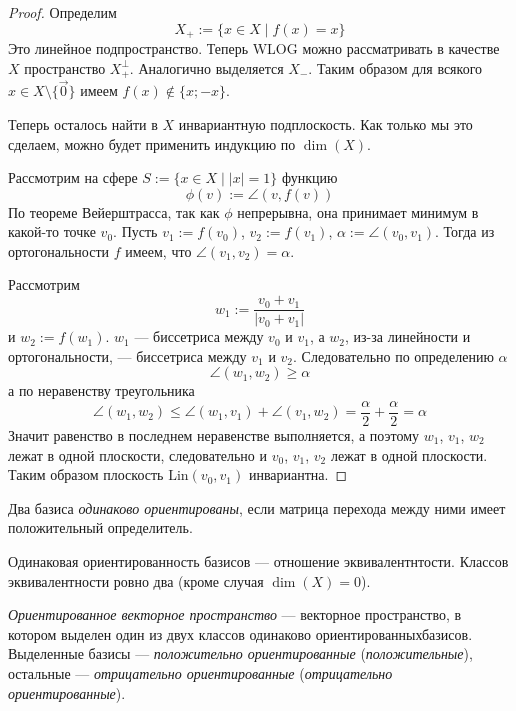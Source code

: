 \documentclass[12pt,a4paper]{article}
\newcommand{\Lin}{\ensuremath{\mathrm{Lin}}\xspace}
\begin{document}
    \begin{proof}
        Определим
        \[X_+ := \{x \in X \mid f(x) = x\}\]
        Это линейное подпространство. Теперь WLOG можно рассматривать в качестве $X$ пространство $X_+^\perp$. Аналогично выделяется $X_-$. Таким образом для всякого $x \in X \setminus \{\vec{0}\}$ имеем $f(x) \notin \{x; -x\}$.

        Теперь осталось найти в $X$ инвариантную подплоскость. Как только мы это сделаем, можно будет применить индукцию по $\dim(X)$.

        Рассмотрим на сфере $S := \{x \in X \mid |x| = 1\}$ функцию
        \[\phi(v) := \angle(v, f(v))\]
        По теореме Вейерштрасса, так как $\phi$ непрерывна, она принимает минимум в какой-то точке $v_0$. Пусть $v_1 := f(v_0)$, $v_2 := f(v_1)$, $\alpha := \angle(v_0, v_1)$. Тогда из ортогональности $f$ имеем, что $\angle(v_1, v_2) = \alpha$.
        
        Рассмотрим
        \[w_1 := \frac{v_0 + v_1}{|v_0 + v_1|}\]
        и $w_2 := f(w_1)$. $w_1$ --- биссетриса между $v_0$ и $v_1$, а $w_2$, из-за линейности и ортогональности, --- биссетриса между $v_1$ и $v_2$. Следовательно по определению $\alpha$
        \[\angle(w_1, w_2) \geqslant \alpha\]
        а по неравенству треугольника
        \[\angle(w_1, w_2) \leqslant \angle(w_1, v_1) + \angle(v_1, w_2) = \frac{\alpha}{2} + \frac{\alpha}{2} = \alpha\]
        Значит равенство в последнем неравенстве выполняется, а поэтому $w_1$, $v_1$, $w_2$ лежат в одной плоскости, следовательно и $v_0$, $v_1$, $v_2$ лежат в одной плоскости. Таким образом плоскость $\Lin(v_0, v_1)$ инвариантна.
    \end{proof}

    \begin{definition}
        Два базиса \emph{одинаково ориентированы}, если матрица перехода между ними имеет положительный определитель.
    \end{definition}

    \begin{theorem}
        Одинаковая ориентированность базисов --- отношение эквивалентнтости. Классов эквивалентности ровно два (кроме случая $\dim(X) = 0$).
    \end{theorem}

    \begin{definition}
        \emph{Ориентированное векторное пространство} --- векторное пространство, в котором выделен один из двух классов одинаково ориентированныхбазисов. Выделенные базисы --- \emph{положительно ориентированные} (\emph{положительные}), остальные --- \emph{отрицательно ориентированные} (\emph{отрицательно ориентированные}).
    \end{definition}
\end{document}

